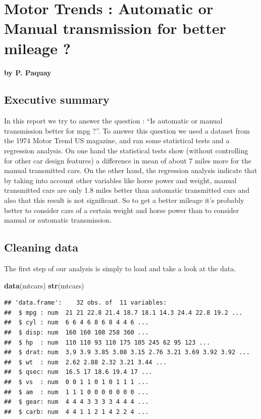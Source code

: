 \documentclass[a3paper]{article}
\author{}
\date{}
\newenvironment{Shaded}{\begin{snugshade}}{\end{snugshade}}
\newcommand{\KeywordTok}[1]{\textcolor[rgb]{0.13,0.29,0.53}{\textbf{{#1}}}}
\newcommand{\NormalTok}[1]{{#1}}
\begin{document}
\begin{center}
\normalsize
\end{center}


\section{Motor Trends : Automatic or Manual transmission for better
mileage
?}\label{motor-trends-automatic-or-manual-transmission-for-better-mileage}

\textbf{by P. Paquay}

\subsection{Executive summary}\label{executive-summary}

In this report we try to answer the question : ``Is automatic or manual
transmission better for mpg ?''. To answer this question we used a
dataset from the 1974 Motor Trend US magazine, and ran some statistical
tests and a regression analysis. On one hand the statistical tests show
(without controlling for other car design features) a difference in mean
of about 7 miles more for the manual transmitted cars. On the other
hand, the regression analysis indicate that by taking into account other
variables like horse power and weight, manual transmitted cars are only
1.8 miles better than automatic transmitted cars and also that this
result is not significant. So to get a better mileage it's probably
better to consider cars of a certain weight and horse power than to
consider manual or automatic transmission.

\subsection{Cleaning data}\label{cleaning-data}

The first step of our analysis is simply to load and take a look at the
data.

\begin{Shaded}
\begin{Highlighting}[]
\KeywordTok{data}\NormalTok{(mtcars)}
\KeywordTok{str}\NormalTok{(mtcars)}
\end{Highlighting}
\end{Shaded}

\begin{verbatim}
## 'data.frame':    32 obs. of  11 variables:
##  $ mpg : num  21 21 22.8 21.4 18.7 18.1 14.3 24.4 22.8 19.2 ...
##  $ cyl : num  6 6 4 6 8 6 8 4 4 6 ...
##  $ disp: num  160 160 108 258 360 ...
##  $ hp  : num  110 110 93 110 175 105 245 62 95 123 ...
##  $ drat: num  3.9 3.9 3.85 3.08 3.15 2.76 3.21 3.69 3.92 3.92 ...
##  $ wt  : num  2.62 2.88 2.32 3.21 3.44 ...
##  $ qsec: num  16.5 17 18.6 19.4 17 ...
##  $ vs  : num  0 0 1 1 0 1 0 1 1 1 ...
##  $ am  : num  1 1 1 0 0 0 0 0 0 0 ...
##  $ gear: num  4 4 4 3 3 3 3 4 4 4 ...
##  $ carb: num  4 4 1 1 2 1 4 2 2 4 ...
\end{verbatim}
\end{document}
